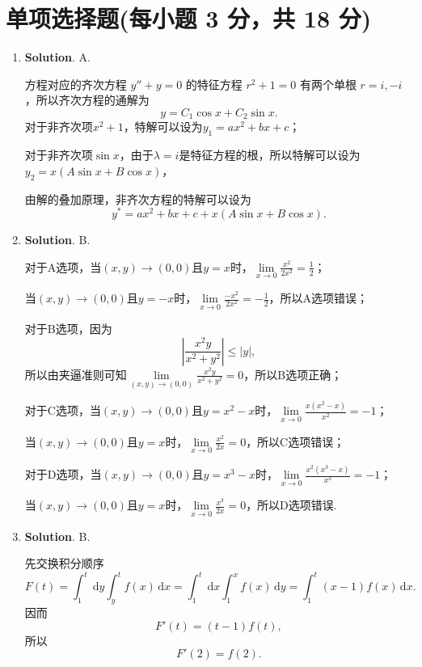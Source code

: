 \documentclass[../main.tex]{subfiles}
\begin{document}
\section{单项选择题(每小题 3 分，共 18 分)}
\begin{enumerate}
    \item \textbf{Solution}. A.

          方程对应的齐次方程 \( y'' + y = 0 \) 的特征方程 \( r^2 + 1 = 0 \) 有两个单根 \( r = i, -i \)，所以齐次方程的通解为
          \[
              y = C_1 \cos x + C_2 \sin x.
          \]
          对于非齐次项$x^2+1$，特解可以设为$y_1=ax^2+bx+c$；

          对于非齐次项$\sin x$，由于$\lambda=i$是特征方程的根，所以特解可以设为$y_2=x(A\sin x+B\cos x)$，

          由解的叠加原理，非齐次方程的特解可以设为
          \[
              y^* = ax^2 + bx + c + x(A\sin x + B\cos x).
          \]

    \item \textbf{Solution}. B.

          对于A选项，当$(x,y)\to(0,0)$且$y=x$时，$\lim\limits_{x\to0}\frac{x^2}{2x^2}=\frac{1}{2}$；

          当$(x,y)\to(0,0)$且$y=-x$时，$\lim\limits_{x\to0}\frac{-x^2}{2x^2}=-\frac{1}{2}$，所以A选项错误；

          对于B选项，因为
          \[
              \left|\frac{x^2 y}{x^2+y^2}\right|\leq |y|,
          \]
          所以由夹逼准则可知$\lim\limits_{(x,y)\to(0,0)}\frac{x^2 y}{x^2+y^2}=0$，所以B选项正确；

          对于C选项，当$(x,y)\to(0,0)$且$y=x^2-x$时，$\lim\limits_{x\to0}\frac{x\left(x^2-x\right)}{x^2}=-1$；

          当$(x,y)\to(0,0)$且$y=x$时，$\lim\limits_{x\to0}\frac{x^2}{2x}=0$，所以C选项错误；

          对于D选项，当$(x,y)\to(0,0)$且$y=x^3-x$时，$\lim\limits_{x\to0}\frac{x^2\left(x^3-x\right)}{x^3}=-1$；

          当$(x,y)\to(0,0)$且$y=x$时，$\lim\limits_{x\to0}\frac{x^3}{2x}=0$，所以D选项错误.

    \item \textbf{Solution}. B.

          先交换积分顺序
          \[
              F(t)=\int_1^t\,\mathrm{d}y\int_y^t f(x)\,\mathrm{d}x=\int_{1}^{t}\,\mathrm{d}x\int_{1}^{x}f(x)\,\mathrm{d}y=\int_1^t(x-1)f(x)\,\mathrm{d}x.
          \]
          因而
          \[
              F'(t)=(t-1)f(t),
          \]
          所以
          \[
              F'(2)=f(2).
          \]


\end{enumerate}
\end{document}

